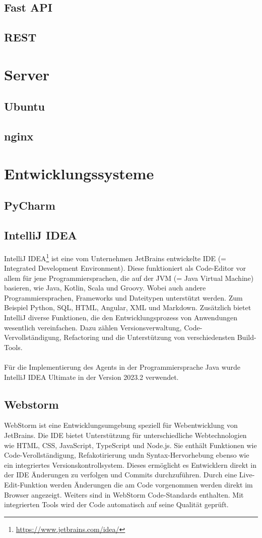\documentclass{report}
\begin{document}
\subsection{Fast API}
\subsection{REST}

\section{Server}
\subsection{Ubuntu}
\subsection{nginx}

\section{Entwicklungssysteme}
\subsection{PyCharm}
\subsection{IntelliJ IDEA}
IntelliJ IDEA\footnote{\url{https://www.jetbrains.com/idea/}} ist eine vom Unternehmen JetBrains entwickelte IDE (= Integrated Development Environment). Diese funktioniert als Code-Editor vor allem für jene Programmiersprachen, die auf der JVM (= Java Virtual Machine) basieren, wie Java, Kotlin, Scala und Groovy. Wobei auch andere Programmiersprachen, Frameworks und Dateitypen unterstützt werden. Zum Beispiel Python, SQL, HTML, Angular, XML und Markdown. Zusätzlich bietet IntelliJ diverse Funktionen, die den Entwicklungsprozess von Anwendungen wesentlich vereinfachen. Dazu zählen Versionsverwaltung, Code-Vervollständigung, Refactoring und die Unterstützung von verschiedensten Build-Tools.\\\\
Für die Implementierung des Agents in der Programmiersprache Java wurde IntelliJ IDEA Ultimate in der Version 2023.2 verwendet.

\subsection{Webstorm}
WebStorm ist eine Entwicklungsumgebung speziell für Webentwicklung von JetBrains. Die IDE bietet Unterstützung für unterschiedliche Webtechnologien wie HTML, CSS, JavaScript, TypeScript und Node.js. Sie enthält Funktionen wie Code-Verollständigung, Refakotirierung undn Syntax-Hervorhebung ebenso wie ein integriertes Versionskontrollsystem. Dieses ermöglicht es Entwicklern direkt in der IDE Änderungen zu verfolgen und Commits durchzuführen. Durch eine Live-Edit-Funktion werden Änderungen die am Code vorgenommen werden direkt im Browser angezeigt. Weiters sind in WebStorm Code-Standards enthalten. Mit integrierten Tools wird der Code automatisch auf seine Qualität geprüft.
\end{document}
